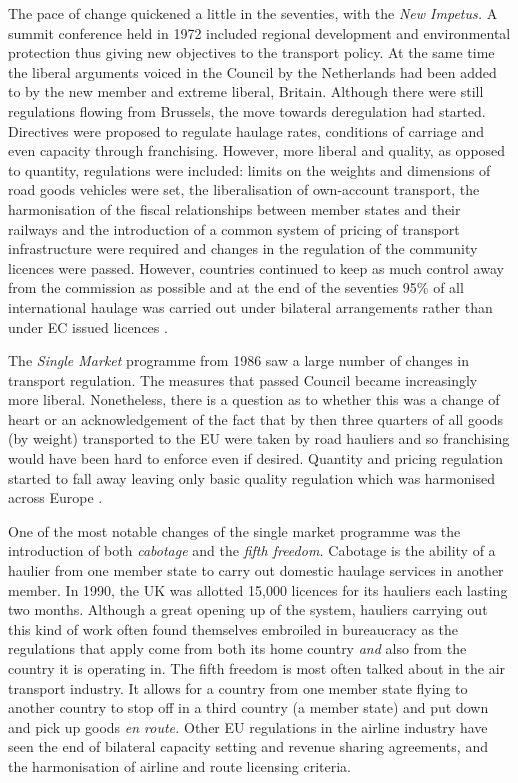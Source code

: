 The pace of change quickened a little in the seventies, with the \textit{New Impetus.} A summit conference held in 1972 included regional development and environmental protection thus giving new objectives to the transport policy. At the same time the liberal arguments voiced in the Council by the Netherlands had been added to by the new member and extreme liberal, Britain. Although there were still regulations flowing from Brussels, the move towards deregulation had started. Directives were proposed to regulate haulage rates, conditions of carriage and even capacity through franchising. However, more liberal and quality, as opposed to quantity, regulations were included: limits on the weights and dimensions of road goods vehicles were set, the liberalisation of own-account transport, the harmonisation of the fiscal relationships between member states and their railways and the introduction of a common system of pricing of transport infrastructure were required and changes in the regulation of the community licences were passed. However, countries continued to keep as much control away from the commission as possible and at the end of the seventies 95\% of all international haulage was carried out under bilateral arrangements rather than under EC issued licences \cite{Swann:1992}.

The \textit{Single Market} programme from 1986 saw a large number of changes in transport regulation. The measures that passed Council became increasingly more liberal. Nonetheless, there is a question as to whether this was a change of heart or an acknowledgement of the fact that by then three quarters of all goods (by weight) transported to the EU were taken by road hauliers and so franchising would have been hard to enforce even if desired. Quantity and pricing regulation started to fall away leaving only basic quality regulation which was harmonised across Europe \cite{TNT:1990}.

One of the most notable changes of the single market programme was the introduction of both \textit{cabotage} and the \textit{fifth freedom.} Cabotage is the ability of a haulier from one member state to carry out domestic haulage services in another member. In 1990, the UK was allotted 15,000 licences for its hauliers each lasting two months. Although a great opening up of the system, hauliers carrying out this kind of work often found themselves embroiled in bureaucracy as the regulations that apply come from both its home country \textit{and} also from the country it is operating in. The fifth freedom is most often talked about in the air transport industry. It allows for a country from one member state flying to another country to stop off in a third country (a member state) and put down and pick up goods \textit{en route.} Other EU regulations in the airline industry have seen the end of bilateral capacity setting and revenue sharing agreements, and the harmonisation of airline and route licensing criteria.

